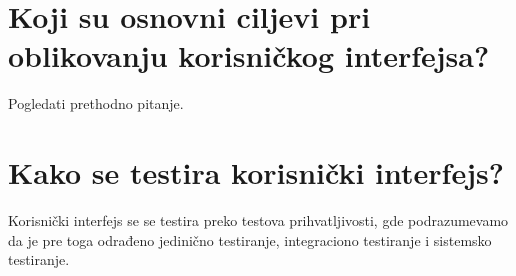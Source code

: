 \documentclass[a4paper]{article}
\begin{document}
\section{Koji su osnovni ciljevi pri oblikovanju korisničkog interfejsa?}
  Pogledati prethodno pitanje.

\section{Kako se testira korisnički interfejs?}
  Korisnički interfejs se se testira preko testova prihvatljivosti, gde podrazumevamo da je pre
  toga odrađeno jedinično testiranje, integraciono testiranje i sistemsko testiranje.

\newpage

\appendix
 

\end{document}
